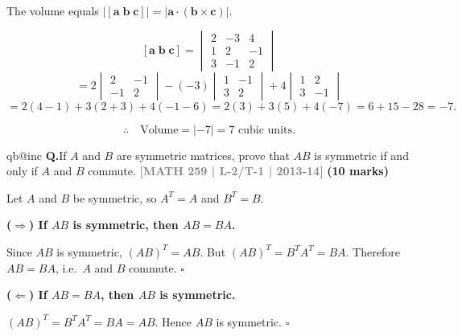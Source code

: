 \documentclass[12pt,a3paper]{article}
\makeatletter
\newcommand{\yr}[1]{\hfill\textcolor{gray}{\small\textbf{[#1]}}}
\newcommand{\mk}[1]{\textcolor{orange!70!black}{\small\textbf{(#1 marks)}}}
\newcounter{qnum}
\newcommand{\Q}[1]{%
  \csname qb@inc\endcsname
  \needspace{4\baselineskip}
  \refstepcounter{qnum}
  \vspace{6pt}
  \noindent\textbf{Q\theqnum.}\enspace #1\par
}
\makeatother
\begin{document}
\begin{tcolorbox}[enhanced,breakable,
  colback=cA!4,colframe=cA,boxrule=0.8pt,arc=5pt,
  title={\textbf{Answer --- Volume of Parallelepiped with $\mathbf{a}=2\hat{i}-3\hat{j}+4\hat{k}$, etc.}},
  fonttitle=\bfseries\color{white},colbacktitle=cA]
 
The volume equals $|[\mathbf{a}\;\mathbf{b}\;\mathbf{c}]| = |\mathbf{a}\cdot(\mathbf{b}\times\mathbf{c})|$.
 
\[
[\mathbf{a}\;\mathbf{b}\;\mathbf{c}] = \begin{vmatrix}2&-3&4\\1&2&-1\\3&-1&2\end{vmatrix}
\]
\[
= 2\begin{vmatrix}2&-1\\-1&2\end{vmatrix}
-(-3)\begin{vmatrix}1&-1\\3&2\end{vmatrix}
+4\begin{vmatrix}1&2\\3&-1\end{vmatrix}
\]
\[
= 2(4-1) + 3(2+3) + 4(-1-6)
= 2(3) + 3(5) + 4(-7)
= 6 + 15 - 28 = -7.
\]
 
\[
\therefore\quad \text{Volume} = |{-7}| = \boxed{7 \text{ cubic units}}.
\]
 
\end{tcolorbox}
 

\Q{If $A$ and $B$ are symmetric matrices, prove that $AB$ is symmetric if and only if $A$ and $B$ commute.
\yr{MATH 259 | L-2/T-1 | 2013-14} \mk{10}}

\begin{tcolorbox}[enhanced,breakable,
  colback=cA!4,colframe=cA,boxrule=0.8pt,arc=5pt,
  title={\textbf{Answer --- $AB$ Symmetric $\iff$ $A$ and $B$ Commute}},
  fonttitle=\bfseries\color{white},colbacktitle=cA]
 
Let $A$ and $B$ be symmetric, so $A^T = A$ and $B^T = B$.
 
\medskip
\textbf{($\Rightarrow$) If $AB$ is symmetric, then $AB = BA$.}
 
Since $AB$ is symmetric, $(AB)^T = AB$.
But $(AB)^T = B^T A^T = BA$.
Therefore $AB = BA$, i.e.\ $A$ and $B$ commute. \hfill$\square$
 
\medskip
\textbf{($\Leftarrow$) If $AB = BA$, then $AB$ is symmetric.}
 
$(AB)^T = B^T A^T = BA = AB$.
Hence $AB$ is symmetric. \hfill$\square$
 
\end{tcolorbox}
 
\end{document}
